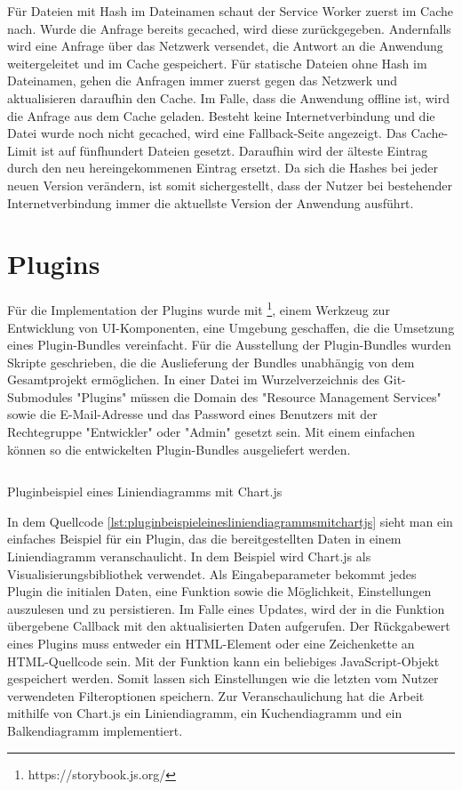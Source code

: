 Für Dateien mit Hash im Dateinamen schaut der Service Worker zuerst im Cache nach.
Wurde die Anfrage bereits gecached, wird diese zurückgegeben. Andernfalls wird eine Anfrage über das
Netzwerk versendet, die Antwort an die Anwendung weitergeleitet und im Cache gespeichert.
Für statische Dateien ohne Hash im Dateinamen, gehen die Anfragen immer zuerst gegen das Netzwerk und
aktualisieren daraufhin den Cache. Im Falle, dass die Anwendung offline ist, wird die Anfrage aus
dem Cache geladen. Besteht keine Internetverbindung und die Datei wurde noch nicht gecached, wird
eine Fallback-Seite angezeigt. Das Cache-Limit ist auf fünfhundert Dateien gesetzt. Daraufhin wird der älteste
Eintrag durch den neu hereingekommenen Eintrag ersetzt. Da sich die Hashes bei jeder neuen Version verändern,
ist somit sichergestellt, dass der Nutzer bei bestehender Internetverbindung immer die aktuellste Version
der Anwendung ausführt.

\section{Plugins}
\label{sec:plugins}
Für die Implementation der Plugins wurde mit \footnote{https://storybook.js.org/}, einem Werkzeug
zur Entwicklung von UI-Komponenten, eine Umgebung geschaffen, die die Umsetzung eines Plugin-Bundles vereinfacht.
Für die Ausstellung der Plugin-Bundles wurden Skripte geschrieben, die die Auslieferung der Bundles unabhängig
von dem Gesamtprojekt ermöglichen. In einer  Datei im Wurzelverzeichnis des Git-Submodules "Plugins"
müssen die Domain des "Resource Management Services" sowie die E-Mail-Adresse und das Password eines Benutzers mit
der Rechtegruppe "Entwickler" oder "Admin" gesetzt sein. Mit einem einfachen  können so
die entwickelten Plugin-Bundles ausgeliefert werden.

\begin{listing}
    \inputminted{js}{snippets/js/ChartExample.js}
    \caption{Pluginbeispiel eines Liniendiagramms mit Chart.js}
    \label{lst:pluginbeispieleinesliniendiagrammsmitchartjs}
\end{listing}

In dem Quellcode \ref{lst:pluginbeispieleinesliniendiagrammsmitchartjs} sieht man ein einfaches
Beispiel für ein Plugin, das die bereitgestellten Daten in einem Liniendiagramm veranschaulicht.
In dem Beispiel wird Chart.js als Visualisierungsbibliothek verwendet. Als Eingabeparameter
bekommt jedes Plugin die initialen Daten, eine  Funktion sowie die Möglichkeit,
Einstellungen auszulesen und zu persistieren. Im Falle eines Updates, wird der in die
 Funktion übergebene Callback mit den aktualisierten Daten aufgerufen.
Der Rückgabewert eines Plugins muss entweder ein HTML-Element oder eine Zeichenkette an HTML-Quellcode
sein. Mit der  Funktion kann ein beliebiges JavaScript-Objekt gespeichert werden.
Somit lassen sich Einstellungen wie die letzten vom Nutzer verwendeten Filteroptionen speichern.
Zur Veranschaulichung hat die Arbeit mithilfe von Chart.js ein Liniendiagramm, ein Kuchendiagramm und
ein Balkendiagramm implementiert.

